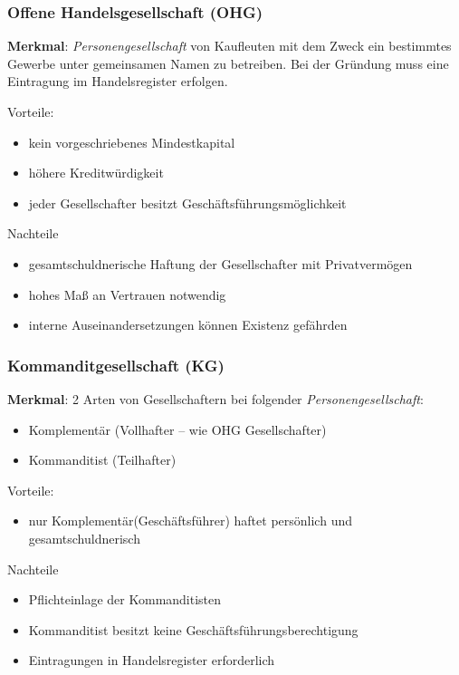 \documentclass[]{article}
\begin{document}
\newpage
\subsubsection{Offene Handelsgesellschaft (OHG)}
\textbf{Merkmal}: \textit{Personengesellschaft} von Kaufleuten mit dem Zweck ein bestimmtes Gewerbe unter gemeinsamen Namen zu betreiben. Bei der Gründung muss eine Eintragung im Handelsregister erfolgen.

\begin{minipage}[t]{0.45\textwidth}
	Vorteile:
	\begin{itemize}
		\item kein vorgeschriebenes Mindestkapital
		\item höhere Kreditwürdigkeit
		\item jeder Gesellschafter besitzt Geschäftsführungsmöglichkeit
	\end{itemize}
\end{minipage}
\hfill
\begin{minipage}[t]{0.45\textwidth}
	Nachteile
	\begin{itemize}
		\item gesamtschuldnerische Haftung der Gesellschafter mit Privatvermögen
		\item hohes Maß an Vertrauen notwendig
		\item interne Auseinandersetzungen können Existenz gefährden
	\end{itemize}
\end{minipage}

\subsubsection{Kommanditgesellschaft (KG)}
\textbf{Merkmal}: 2 Arten von Gesellschaftern bei folgender \textit{Personengesellschaft}:
\begin{itemize}
	\item Komplementär (Vollhafter – wie OHG Gesellschafter)
	\item Kommanditist (Teilhafter)
\end{itemize}

\begin{minipage}[t]{0.45\textwidth}
	Vorteile:
	\begin{itemize}
		\item nur Komplementär(Geschäftsführer) haftet persönlich und gesamtschuldnerisch
	\end{itemize}
\end{minipage}
\hfill
\begin{minipage}[t]{0.45\textwidth}
	Nachteile
	\begin{itemize}
		\item Pflichteinlage der Kommanditisten
		\item Kommanditist besitzt keine Geschäftsführungsberechtigung
		\item Eintragungen in Handelsregister erforderlich
	\end{itemize}
\end{minipage}
\end{document}
